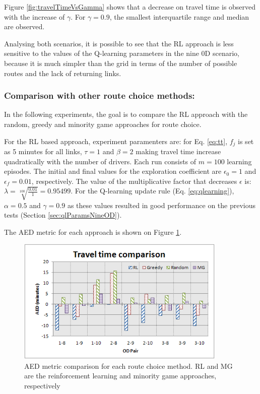 \documentclass{RITA}
\newcommand{\fftt}{\ensuremath{f_j}} 		%
\begin{document}
Figure \ref{fig:travelTimeVsGamma} shows that a decrease on travel time is observed with the increase of $\gamma$. For $\gamma = 0.9$, the smallest interquartile range and median are observed.

Analysing both scenarios, it is possible to see that the RL approach is less sensitive to the values of the Q-learning parameters in the nine 0D scenario, because it is much simpler than the grid in terms of the number of possible routes and the lack of returning links. 

\subsubsection{Comparison with other route choice methods:}
In the following experiments, the goal is to compare the RL approach with the random, greedy and minority game approaches for route choice.

For the RL based approach, experiment paramenters are: for Eq. \eqref{eq:tt}, $\fftt$ is set as 5 minutes for all links, $\tau = 1$ and $\beta = 2$ making travel time increase quadratically with the number of drivers. Each run consists of $m = 100$ learning episodes. The initial and final values for the exploration coefficient are $\epsilon_0 = 1$ and $\epsilon_f = 0.01$, respectively. The value of the multiplicative factor that decreases $\epsilon$ is: $\lambda = \sqrt[100]{\frac{0.01}{1}} = 0.95499$. For the Q-learning update rule (Eq. \eqref{eq:qlearning}), $\alpha = 0.5$ and $\gamma = 0.9$ as these values resulted in good performance on the previous tests (Section \ref{sec:qlParamsNineOD}).

The AED metric for each approach is shown on Figure \ref{fig:travelTimeComparison}. 

\begin{figure}[ht]
    \centerline{\includegraphics[width=10cm]{img/travelTimeComparison-hatched.png}}
    \caption{AED metric comparison for each route choice method. RL and MG are the reinforcement learning and minority game approaches, respectively}
    \label{fig:travelTimeComparison}
\end{figure}
\end{document}
